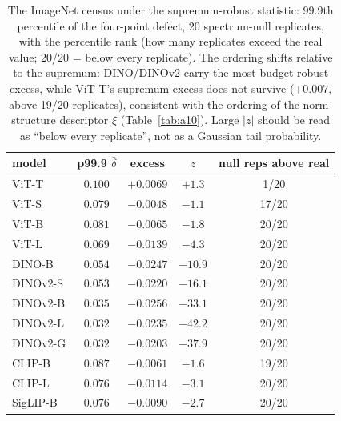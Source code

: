 \begin{table}[H]
\centering
\small
\begin{tabular}{lcccc}
\toprule
model & p99.9 $\hat\delta$ & excess & $z$ & null reps above real \\
\midrule
ViT-T & $0.100$ & $+0.0069$ & $+1.3$ & 1/20 \\
ViT-S & $0.079$ & $-0.0048$ & $-1.1$ & 17/20 \\
ViT-B & $0.081$ & $-0.0065$ & $-1.8$ & 20/20 \\
ViT-L & $0.069$ & $-0.0139$ & $-4.3$ & 20/20 \\
\midrule
DINO-B & $0.054$ & $-0.0247$ & $-10.9$ & 20/20 \\
DINOv2-S & $0.053$ & $-0.0220$ & $-16.1$ & 20/20 \\
DINOv2-B & $0.035$ & $-0.0256$ & $-33.1$ & 20/20 \\
DINOv2-L & $0.032$ & $-0.0235$ & $-42.2$ & 20/20 \\
DINOv2-G & $0.032$ & $-0.0203$ & $-37.9$ & 20/20 \\
\midrule
CLIP-B & $0.087$ & $-0.0061$ & $-1.6$ & 19/20 \\
CLIP-L & $0.076$ & $-0.0114$ & $-3.1$ & 20/20 \\
SigLIP-B & $0.076$ & $-0.0090$ & $-2.7$ & 20/20 \\
\bottomrule
\end{tabular}
\caption{The ImageNet census under the supremum-robust statistic: 99.9th percentile of the four-point defect, 20 spectrum-null replicates, with the percentile rank (how many replicates exceed the real value; 20/20 = below every replicate). The ordering shifts relative to the supremum: DINO/DINOv2 carry the most budget-robust excess, while ViT-T's supremum excess does not survive ($+0.007$, above 19/20 replicates), consistent with the ordering of the norm-structure descriptor $\xi$ (Table~\ref{tab:a10}). Large $|z|$ should be read as ``below every replicate'', not as a Gaussian tail probability.}
\label{tab:b18-p999}
\end{table}
